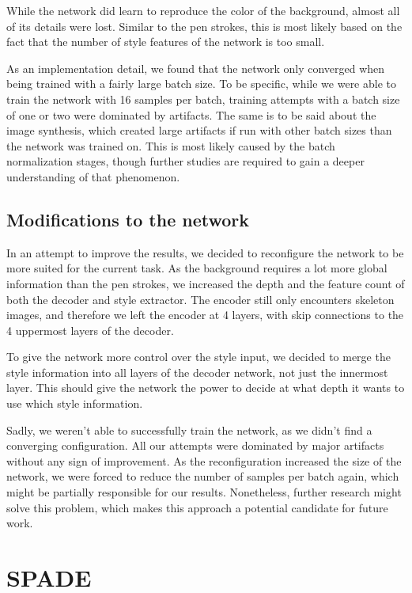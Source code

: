 While the network did learn to reproduce the color of the background, almost all of its details were lost. Similar to the pen strokes, this is most likely based on the fact that the number of style features of the network is too small.

As an implementation detail, we found that the network only converged when being trained with a fairly large batch size. To be specific, while we were able to train the network with 16 samples per batch, training attempts with a batch size of one or two were dominated by artifacts. The same is to be said about the image synthesis, which created large artifacts if run with other batch sizes than the network was trained on. This is most likely caused by the batch normalization stages, though further studies are required to gain a deeper understanding of that phenomenon.

\subsection{Modifications to the network}
In an attempt to improve the results, we decided to reconfigure the network to be more suited for the current task. As the background requires a lot more global information than the pen strokes, we increased the depth and the feature count of both the decoder and style extractor. The encoder still only encounters skeleton images, and therefore we left the encoder at 4 layers, with skip connections to the 4 uppermost layers of the decoder.

To give the network more control over the style input, we decided to merge the style information into all layers of the decoder network, not just the innermost layer. This should give the network the power to decide at what depth it wants to use which style information.

Sadly, we weren't able to successfully train the network, as we didn't find a converging configuration. All our attempts were dominated by major artifacts without any sign of improvement. As the reconfiguration increased the size of the network, we were forced to reduce the number of samples per batch again, which might be partially responsible for our results. Nonetheless, further research might solve this problem, which makes this approach a potential candidate for future work.




\section{SPADE}\label{section:backgroundTransferSpade}


